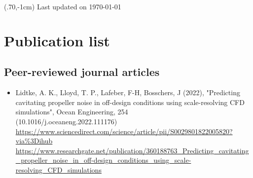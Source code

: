 \documentclass[a4paper,10pt]{article}
\begin{document}
\pagestyle{empty} %

\begin{textblock*}{100mm}(.70\textwidth,-1cm)
Last updated on \today
\end{textblock*}

\section{Publication list}

\subsection{Peer-reviewed journal articles}
%
\begin{itemize}
%
\item Lidtke, A. K., Lloyd, T. P., Lafeber, F-H, Bosschers, J (2022),
    "Predicting cavitating propeller noise in off-design conditions using scale-resolving CFD simulations",
    Ocean Engineering, 254
    \cite{lidtke_predicting_2022}
    \\ (10.1016/j.oceaneng.2022.111176)
    \\ \url{https://www.sciencedirect.com/science/article/pii/S0029801822005820?via\%3Dihub}
    \\ \url{https://www.researchgate.net/publication/360188763_Predicting_cavitating_propeller_noise_in_off-design_conditions_using_scale-resolving_CFD_simulations}


\end{itemize}
\end{document}
